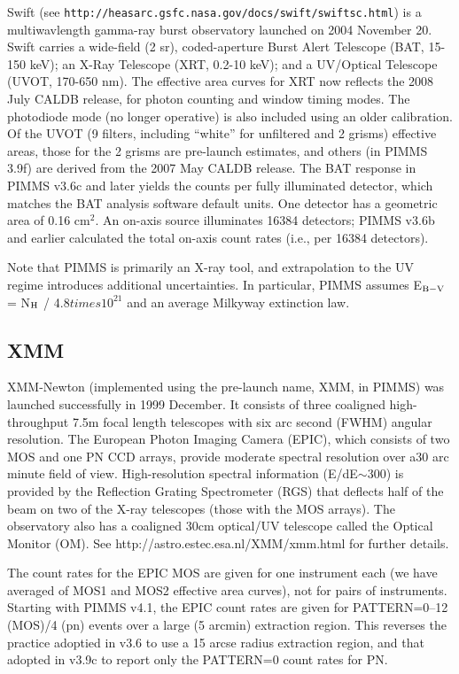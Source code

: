 \documentclass[11pt]{article}
\begin{document}
Swift (see {\tt http://heasarc.gsfc.nasa.gov/docs/swift/swiftsc.html}) is
a multiwavlength gamma-ray burst observatory launched on 2004 November 20.
Swift carries a wide-field (2 sr), coded-aperture Burst Alert Telescope
(BAT, 15-150 keV); an X-Ray Telescope (XRT, 0.2-10 keV); and a UV/Optical
Telescope (UVOT, 170-650 nm).  The effective area curves for XRT now
reflects the 2008 July CALDB release, for photon counting and window timing
modes.  The photodiode mode (no longer operative) is also included
using an older calibration.  Of the UVOT (9 filters, including ``white''
for unfiltered and 2 grisms) effective areas, those for the 2 grisms
are pre-launch estimates, and others (in PIMMS 3.9f) are derived from
the 2007 May CALDB release.  The BAT response in PIMMS v3.6c and later
yields the counts per fully illuminated detector, which matches the BAT
analysis software default units.  One detector has a geometric area of
0.16 cm$^2$.  An on-axis source illuminates 16384 detectors; PIMMS v3.6b
and earlier calculated the total on-axis count rates (i.e., per 16384
detectors).

Note that PIMMS is primarily an X-ray tool, and extrapolation to the
UV regime introduces additional uncertainties.  In particular, PIMMS
assumes E$_{\rm B-V}$ = N$_{\rm H}$ / 4.8$times 10^{21}$
and an average Milkyway extinction law.

\subsection{XMM}

XMM-Newton (implemented using the pre-launch name, XMM, in PIMMS) was launched
successfully in 1999 December.  It consists of three coaligned
high-throughput 7.5m focal length telescopes with six arc second (FWHM)
angular resolution.  The European Photon Imaging Camera (EPIC), which
consists of two MOS and one PN CCD arrays, provide moderate spectral
resolution over a30 arc minute field of view.  High-resolution
spectral information (E/dE$\sim$300) is provided by the Reflection Grating
Spectrometer (RGS) that deflects half of the beam on two of the X-ray
telescopes (those with the MOS arrays).  The observatory also has a
coaligned 30cm optical/UV telescope called the Optical Monitor (OM).  
See http://astro.estec.esa.nl/XMM/xmm.html for further details.

The count rates for the EPIC MOS are given for one instrument each
(we have averaged of MOS1 and MOS2 effective area curves), not for
pairs of instruments.  Starting with PIMMS v4.1, the EPIC count rates are
given for PATTERN=0--12 (MOS)/4 (pn) events over a large (5 arcmin)
extraction region.  This reverses the practice adoptied in v3.6
to use a 15 arcse radius extraction region, and that adopted in
v3.9c to report only the PATTERN=0 count rates for PN.
\end{document}
